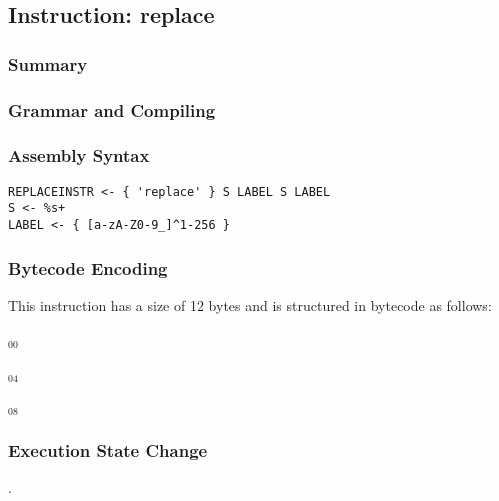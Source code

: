\subsection{Instruction: replace}

\subsubsection{Summary}


\subsubsection{Grammar and Compiling}


\subsubsection{Assembly Syntax}

\begin{myquote}
\begin{verbatim}
REPLACEINSTR <- { 'replace' } S LABEL S LABEL
S <- %s+
LABEL <- { [a-zA-Z0-9_]^1-256 }
\end{verbatim}
\end{myquote}

\subsubsection{Bytecode Encoding}

This instruction has a size of 12 bytes and is structured in bytecode as follows:

$_{00}$\ 



$_{04}$\ 



$_{08}$\ 
\fbox{%
  \parbox{20pt}{%
00
  }%
}


\subsubsection{Execution State Change}

.



